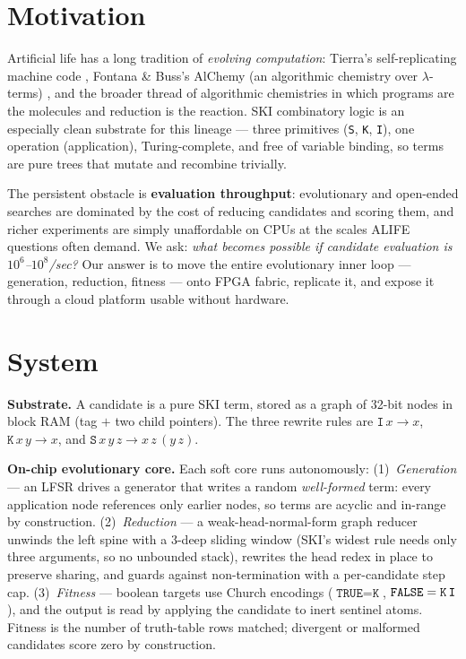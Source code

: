 \documentclass[letterpaper]{article}
\begin{document}
\section{Motivation}
Artificial life has a long tradition of \emph{evolving computation}: Tierra's
self-replicating machine code \citep{ray1991tierra}, Fontana \& Buss's AlChemy
(an algorithmic chemistry over $\lambda$-terms) \citep{fontana1994arrival}, and
the broader thread of algorithmic chemistries in which programs are the
molecules and reduction is the reaction. SKI combinatory logic is an especially
clean substrate for this lineage --- three primitives
(\texttt{S}, \texttt{K}, \texttt{I}), one operation (application),
Turing-complete, and free of variable binding, so terms are pure trees that
mutate and recombine trivially.

The persistent obstacle is \textbf{evaluation throughput}: evolutionary and
open-ended searches are dominated by the cost of reducing candidates and
scoring them, and richer experiments are simply unaffordable on CPUs at the
scales ALIFE questions often demand. We ask: \emph{what becomes possible if
candidate evaluation is $10^6$--$10^8$/sec?} Our answer is to move the entire
evolutionary inner loop --- generation, reduction, fitness --- onto FPGA
fabric, replicate it, and expose it through a cloud platform usable without
hardware.

\section{System}
\textbf{Substrate.} A candidate is a pure SKI term, stored as a graph of 32-bit
nodes in block RAM (tag $+$ two child pointers). The three rewrite rules are
$\texttt{I}\,x \to x$, $\texttt{K}\,x\,y \to x$, and
$\texttt{S}\,x\,y\,z \to x\,z\,(y\,z)$.

\textbf{On-chip evolutionary core.} Each soft core runs autonomously:
(1)~\emph{Generation} --- an LFSR drives a generator that writes a random
\emph{well-formed} term: every application node references only earlier nodes,
so terms are acyclic and in-range by construction. (2)~\emph{Reduction} --- a
weak-head-normal-form graph reducer unwinds the left spine with a 3-deep
sliding window (SKI's widest rule needs only three arguments, so no unbounded
stack), rewrites the head redex in place to preserve sharing, and guards
against non-termination with a per-candidate step cap. (3)~\emph{Fitness} ---
boolean targets use Church encodings ($\texttt{TRUE}=\texttt{K}$,
$\texttt{FALSE}=\texttt{K\,I}$), and the output is read by applying the
candidate to inert sentinel atoms. Fitness is the number of truth-table rows
matched; divergent or malformed candidates score zero by construction.
\end{document}
